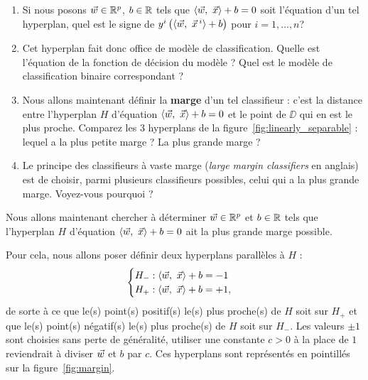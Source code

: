 \documentclass[french,11pt]{article}
\begin{document}
\begin{enumerate}
\item Si nous posons $\ww \in \RR^p$, $b \in \mathbb{R}$ tels que
  $\innerproduct{\ww,~\xx} + b = 0$ soit l'équation d'un tel hyperplan, quel
  est le signe de $y^i \left(\innerproduct{\ww,~\xx^i} + b\right)$ pour $i=1, \dots, n$?
\item Cet hyperplan fait donc office de modèle de classification. Quelle est
  l'équation de la fonction de décision du modèle ? Quel est le modèle de classification
  binaire correspondant ?
\item Nous allons maintenant définir la \textbf{marge} d'un tel classifieur :
  c'est la distance entre l'hyperplan  $H$ d'équation $\innerproduct{\ww,~\xx} + b = 0$ et le
  point de $\DD$ qui en est le plus proche. Comparez les 3 hyperplans de la
  figure~\ref{fig:linearly_separable} : lequel a la plus petite marge ? La plus
  grande marge ?
\item Le principe des classifieurs à vaste marge (\textit{large margin
    classifiers} en anglais) est de choisir, parmi plusieurs classifieurs
  possibles, celui qui a la plus grande marge. Voyez-vous pourquoi ? 
\end{enumerate}

Nous allons maintenant chercher à déterminer $\ww \in \RR^p$ et $b \in \mathbb{R}$
tels que l'hyperplan $H$ d'équation $\innerproduct{\ww,~\xx} + b = 0$ ait la plus
grande marge possible.

Pour cela, nous allons poser définir deux hyperplans parallèles à $H$ :
\begin{equation*}
  \begin{cases}
    H_- : \innerproduct{\ww,~\xx} + b = -1 & \\
    H_+ : \innerproduct{\ww,~\xx} + b = +1, & \\
  \end{cases}
\end{equation*}
de sorte à ce que le(s) point(s) positif(s) le(s) plus proche(s) de $H$ soit sur $H_+$ et que le(s) point(s) négatif(s) le(s) plus proche(s) de $H$ soit sur $H_-$.
Les valeurs $\pm 1$ sont choisies sans perte de généralité, utiliser une constante $c>0$ à la place de $1$ reviendrait à diviser $\ww$ et $b$ par $c$.
Ces hyperplans sont représentés en pointillés sur la figure~\ref{fig:margin}.
\end{document}
